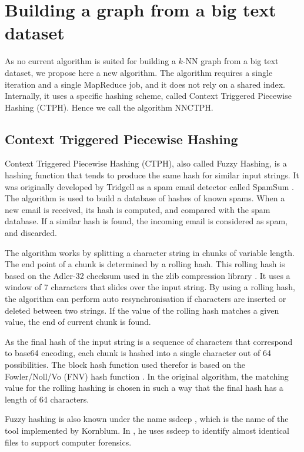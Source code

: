 \documentclass[wcp]{jmlr}
\begin{document}
\section{Building a graph from a big text dataset}

As no current algorithm is suited for building a $k$-NN graph from a big text dataset, we propose here a new algorithm. The algorithm requires a single iteration and a single MapReduce job, and it does not rely on a shared index. Internally, it uses a specific hashing scheme, called Context Triggered Piecewise Hashing (CTPH). Hence we call the algorithm NNCTPH.

\subsection{Context Triggered Piecewise Hashing}

Context Triggered Piecewise Hashing (CTPH), also called Fuzzy Hashing, is a hashing function that tends to produce the same hash for similar input strings. It was originally developed by Tridgell as a spam email detector called SpamSum \cite{SpamSum}. The algorithm is used to build a database of hashes of known spams. When a new email is received, its hash is computed, and compared with the spam database. If a similar hash is found, the incoming email is considered as spam, and discarded.

The algorithm works by splitting a character string in chunks of variable length. The end point of a chunk is determined by a rolling hash. This rolling hash is based on the Adler-32 checksum used in the zlib compression library \cite{zlib}. It uses a window of 7 characters that slides over the input string. By using a rolling hash, the algorithm can perform auto resynchronisation if characters are inserted or deleted between two strings. If the value of the rolling hash matches a given value, the end of current chunk is found.

As the final hash of the input string is a sequence of characters that correspond to base64 encoding, each chunk is hashed into a single character out of 64 possibilities. The block hash function used therefor is based on the Fowler/Noll/Vo (FNV) hash function \cite{FNV}. In the original algorithm, the matching value for the rolling hashing is chosen in such a way that the final hash has a length of 64 characters.

Fuzzy hashing is also known under the name ssdeep \cite{ssdeep}, which is the name of the tool implemented by Kornblum. In \cite{Kornblum200691}, he uses ssdeep to identify almost identical files to support computer forensics.
\end{document}
